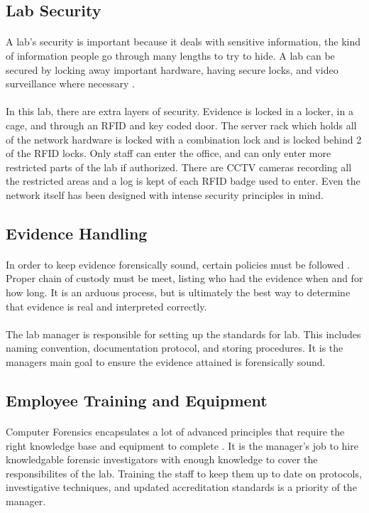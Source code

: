 \documentclass[12pt]{article}
\begin{document}
\subsection{Lab Security}
\paragraph{}
A lab's security is important because it deals with sensitive information, the kind of information people go through many lengths to try to hide.  
A lab can be secured by locking away important hardware, having secure locks, and video surveillance where necessary \cite{website}.
\paragraph{}
In this lab, there are extra layers of security.
Evidence is locked in a locker, in a cage, and through an RFID and key coded door.
The server rack which holds all of the network hardware is locked with a combination lock and is locked behind 2 of the RFID locks.
Only staff can enter the office, and can only enter more restricted parts of the lab if authorized.
There are CCTV cameras recording all the restricted areas and a log is kept of each RFID badge used to enter.
Even the network itself has been designed with intense security principles in mind.

\subsection{Evidence Handling}
\paragraph{}
In order to keep evidence forensically sound, certain policies must be followed \cite{hayes}. 
Proper chain of custody must be meet, listing who had the evidence when and for how long.  
It is an arduous process, but is ultimately the best way to determine that evidence is real and interpreted correctly.
\paragraph{}
The lab manager is responsible for setting up the standards for lab.
This includes naming convention, documentation protocol, and storing procedures.
It is the managers main goal to ensure the evidence attained is forensically sound.
\subsection{Employee Training and Equipment} 
\paragraph{} 
Computer Forensics encapsulates a lot of advanced principles that require the right knowledge base and equipment     to complete \cite{website}. 
It is the manager's job to hire knowledgable forensic investigators with enough knowledge to cover the responsibilites of the lab. 
Training the staff to keep them up to date on protocols, investigative techniques, and updated accreditation standards is a priority of the manager.
\newpage
\printbibliography
\end{document}
